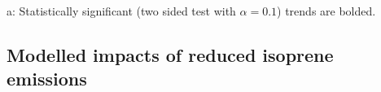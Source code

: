 \begin{table}
\begin{threeparttable}
\begin{tabular}{ l | c  c }
          \bottomrule
        \end{tabular}
        \begin{tablenotes} 
          \item a: Statistically significant (two sided test with $\alpha=0.1$) trends are bolded.
        \end{tablenotes}
        \label{BioIsop:results:trends:tab_trends}
      \end{threeparttable}\end{table}
      
      
   
  \subsection{Modelled impacts of reduced isoprene emissions}
    \label{BioIsop:results:new_emiss}
    
